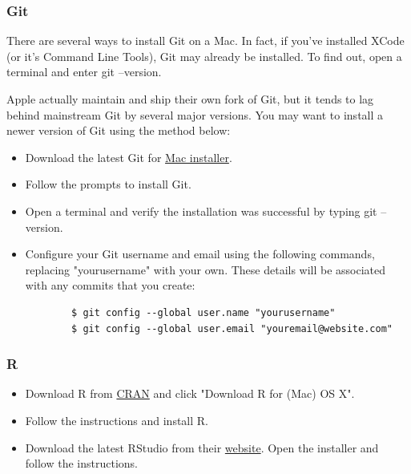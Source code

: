 \documentclass[11pt]{article} %
\begin{document}
    \subsubsection{Git}
    There are several ways to install Git on a Mac. 
    In fact, if you've installed XCode (or it's Command Line Tools), Git may already be installed. 
    To find out, open a terminal and enter git --version. 
    
    Apple actually maintain and ship their own fork of Git, but it tends to lag behind mainstream Git by several major versions. 
    You may want to install a newer version of Git using the method below:
    \begin{itemize}
    	\item Download the latest Git for \href{https://git-scm.com/download/mac}{Mac installer}. 
    	\item Follow the prompts to install Git. 
    	\item Open a terminal and verify the installation was successful by typing git --version. 
    	\item Configure your Git username and email using the following commands, replacing "yourusername" with your own. 
      These details will be associated with any commits that you create:
    	\begin{lstlisting}
    	$ git config --global user.name "yourusername"
    	$ git config --global user.email "youremail@website.com"
    	\end{lstlisting}
    \end{itemize}
    
    \subsubsection{R}
    
    \begin{itemize}
    	\item Download R from \href{http://cran.us.r-project.org/}{CRAN} and click "Download R for (Mac) OS X". 
    	\item Follow the instructions and install R. 
    	\item Download the latest RStudio from their \href{https://www.rstudio.com/products/rstudio/download/}{website}. 
      Open the installer and follow the instructions. 
    \end{itemize}







%
\end{document}
